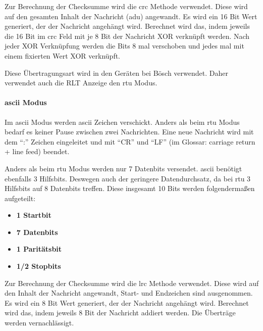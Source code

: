Zur Berechnung der Checksumme wird die \acf{crc} Methode verwendet. Diese wird auf den gesamten Inhalt der Nachricht (\acs{adu}) angewandt. Es wird ein 16 Bit Wert generiert, der der Nachricht angehängt wird. Berechnet wird das, indem jeweils die 16 Bit im \acs{crc} Feld mit je 8 Bit der Nachricht XOR verknüpft werden. Nach jeder XOR Verknüpfung werden die Bits 8 mal verschoben und jedes mal mit einem fixierten Wert XOR verknüpft. 

Diese Übertragungsart wird in den Geräten bei Bösch verwendet. Daher verwendet auch die RLT Anzeige den \acs{rtu} Modus.

\paragraph{\acs{ascii} Modus}
Im \acs{ascii} Modus werden \acs{ascii} Zeichen verschickt. Anders als beim \acs{rtu} Modus bedarf es keiner Pause zwischen zwei Nachrichten. Eine neue Nachricht wird mit dem \enquote{:} Zeichen eingeleitet und mit \enquote{CR} und \enquote{LF} (im Glossar: carriage return + line feed) beendet.

Anders als beim \acs{rtu} Modus werden nur 7 Datenbits versendet. \acs{ascii} benötigt ebenfalls 3 Hilfsbits. Deswegen auch der geringere Datendurchsatz, da bei \acs{rtu} 3 Hilfsbits auf 8 Datenbits treffen. Diese insgesamt 10 Bits werden folgendermaßen aufgeteilt:
\begin{itemize}
	\item \textbf{1 Startbit}
	\item \textbf{7 Datenbits}
	\item \textbf{1 Paritätsbit}
	\item \textbf{1/2 Stopbits}
\end{itemize}

Zur Berechnung der Checksumme wird die \acf{lrc} Methode verwendet. Diese wird auf den Inhalt der Nachricht angewandt, Start- und Endzeichen sind ausgenommen. Es wird ein 8 Bit Wert generiert, der der Nachricht angehängt wird. Berechnet wird das, indem jeweils 8 Bit der Nachricht addiert werden. Die Überträge werden vernachlässigt.

